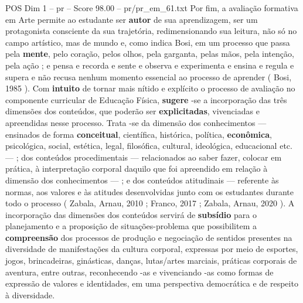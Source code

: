 \begin{textsample}{POS Dim 1 – pr – Score 98.00 – pr/pr\_em\_61.txt}  \label{ex:f1_pos_022}
Por fim, a avaliação formativa em Arte permite ao estudante ser \textbf{autor} de sua aprendizagem, ser um protagonista consciente da sua trajetória, redimensionando sua leitura, não só no campo artístico, mas de mundo e, como indica Bosi, em um processo que passa pela \textbf{mente}, pelo coração, pelos olhos, pela garganta, pelas mãos, pela intenção, pela ação ; e pensa e recorda e sente e observa e experimenta e ensina e regula e supera e não recusa nenhum momento essencial ao processo de aprender ( Bosi, 1985 ).
Com \textbf{intuito} de tornar mais nítido e explícito o processo de avaliação no componente curricular de Educação Física, \textbf{sugere} -se a incorporação das três dimensões dos conteúdos, que poderão ser \textbf{explicitadas}, vivenciadas e apreendidas nesse processo.
Trata -se da dimensão dos conhecimentos — ensinados de forma \textbf{conceitual}, científica, histórica, política, \textbf{econômica}, psicológica, social, estética, legal, filosófica, cultural, ideológica, educacional etc. — ; dos conteúdos procedimentais — relacionados ao saber fazer, colocar em prática, à interpretação corporal daquilo que foi apreendido em relação à dimensão dos conhecimentos — ; e dos conteúdos atitudinais — referente às normas, aos valores e às atitudes desenvolvidas junto com os estudantes durante todo o processo ( Zabala, Arnau, 2010 ; Franco, 2017 ; Zabala, Arnau, 2020 ).
A incorporação das dimensões dos conteúdos servirá de \textbf{subsídio} para o planejamento e a proposição de situações-problema que possibilitem a \textbf{compreensão} dos processos de produção e negociação de sentidos presentes na diversidade de manifestações da cultura corporal, expressas por meio de esportes, jogos, brincadeiras, ginásticas, danças, lutas/artes marciais, práticas corporais de aventura, entre outras, reconhecendo -as e vivenciando -as como formas de expressão de valores e identidades, em uma perspectiva democrática e de respeito à diversidade.

\end{textsample}
